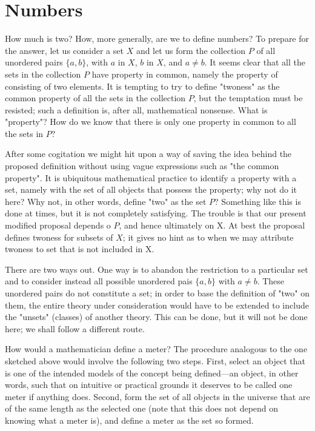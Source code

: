
\chapter{Numbers}

How much is two? How, more generally, are we to define numbers? To prepare for the answer, let us consider a set $X$ and let us form the collection $P$ of all unordered pairs $\{ a, b \}$, with $a$ in $X$, $b$ in $X$, and $a \neq b$. It seems clear that all the sets in the collection $P$ have property in common, namely the property of consisting of two elements. It is tempting to try to define "twoness" as the common property of all the sets in the collection $P$, but the temptation must be resisted; such a definition is, after all, mathematical nonsense. What is "property"? How do we know that there is only one property in common to all the sets in $P$? 

After some cogitation we might hit upon a way of saving the idea behind the proposed definition without using vague expressions such as "the common property". It is ubiquitous  mathematical  practice to identify a property with a set, namely with the set of all objects that possess the property; why not do it here? Why not, in other words, define "two" as the set $P$? Something like this is done at times, but it is not completely satisfying. The trouble is that our present modified proposal depends o $P$, and hence ultimately on X. At best the proposal defines twoness for subsets of $X$; it gives no hint as to when we may attribute twoness to set that is not included in X. 

There are two ways out. One way is to abandon the restriction to a particular set and to consider instead all possible unordered pais $\{ a, b \}$ with $a \neq b$. These unordered pairs do not constitute a set; in order to base the definition of "two" on them, the entire theory under consideration would have to be extended to include the "unsets" (classes) of another theory. This can be done, but it will not be done here; we shall follow a different route. 

How would a mathematician define a meter? The procedure analogous to the one sketched above would involve the following two steps. First, select an object that is one of the intended models of the concept being defined—an object, in other words, such that on intuitive or practical grounds it deserves to be called one meter if anything does. Second, form the set of all objects in the universe that are of the same length as the selected one (note that this does not depend on knowing what a meter is), and define a meter as the set so formed. 

